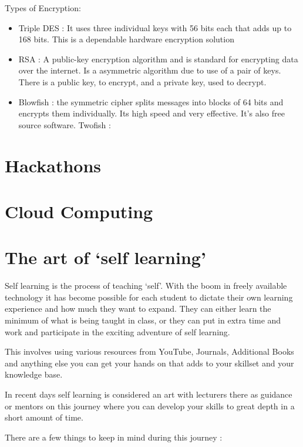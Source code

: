 \documentclass[]{book}
\providecommand{\tightlist}{%
  \setlength{\itemsep}{0pt}\setlength{\parskip}{0pt}}
\theoremstyle{definition}
\theoremstyle{definition}
\theoremstyle{remark}
\begin{document}
Types of Encryption:

\begin{itemize}
\tightlist
\item
  Triple DES : It uses three individual keys with 56 bits each that adds
  up to 168 bits. This is a dependable hardware encryption solution
\item
  RSA : A public-key encryption algorithm and is standard for encrypting
  data over the internet. Is a asymmetric algorithm due to use of a pair
  of keys. There is a public key, to encrypt, and a private key, used to
  decrypt.
\item
  Blowfish : the symmetric cipher splits messages into blocks of 64 bits
  and encrypts them individually. Its high speed and very effective.
  It's also free source software. Twofish :
\end{itemize}

\section{Hackathons}\label{hackathons}

\section{Cloud Computing}\label{cloud-computing}

\section{\texorpdfstring{The art of `self
learning'}{The art of self learning}}\label{the-art-of-self-learning}

Self learning is the process of teaching `self'. With the boom in freely
available technology it has become possible for each student to dictate
their own learning experience and how much they want to expand. They can
either learn the minimum of what is being taught in class, or they can
put in extra time and work and participate in the exciting adventure of
self learning.

This involves using various resources from YouTube, Journals, Additional
Books and anything else you can get your hands on that adds to your
skillset and your knowledge base.

In recent days self learning is considered an art with lecturers there
as guidance or mentors on this journey where you can develop your skills
to great depth in a short amount of time.

There are a few things to keep in mind during this journey :
\end{document}
